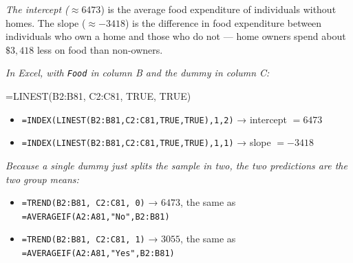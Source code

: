 \documentclass[
  11pt,
  letterpaper,
  DIV=11,
  numbers=noendperiod,
  oneside,
  open=any]{scrreprt}
\newenvironment{Shaded}{\begin{snugshade}}{\end{snugshade}}
\newcommand{\NormalTok}[1]{\textcolor[rgb]{0.00,0.23,0.31}{#1}}
\providecommand{\tightlist}{%
  \setlength{\itemsep}{0pt}\setlength{\parskip}{0pt}}\usepackage{longtable,booktabs,array}
\newenvironment{bsanswerkey}[2]{%
  \begin{tcolorbox}[bsbase, colback=bspaper2, colframe=bsline, fontupper=\small,
    title={\hypertarget{a-#1}{}\label{a-#1}\hyperlink{q-#1}{\textcolor{bsink2}{\MakeUppercase{#2}}}\hfill
      \hyperlink{q-#1}{\textcolor{bsaccent}{\normalfont\footnotesize back to page \pageref{q-#1}}}}]}%
  {\end{tcolorbox}}
\begin{document}
\begin{bsanswerkey}{bsans65}{Exercise 3, question 2}

\emph{The intercept (}\(\approx 6473\)) is the average food expenditure
of individuals without homes. The slope (\(\approx -3418\)) is the
difference in food expenditure between individuals who own a home and
those who do not --- home owners spend about \(\$3,418\) less on food
than non-owners.

\emph{In Excel, with \texttt{Food} in column B and the dummy in column
C:}

\begin{Shaded}
\begin{Highlighting}[]
\NormalTok{=LINEST(B2:B81, C2:C81, TRUE, TRUE)}
\end{Highlighting}
\end{Shaded}

\begin{itemize}
\tightlist
\item
  \texttt{=INDEX(LINEST(B2:B81,C2:C81,TRUE,TRUE),1,2)} → intercept
  \(= 6473\)
\item
  \texttt{=INDEX(LINEST(B2:B81,C2:C81,TRUE,TRUE),1,1)} → slope
  \(= -3418\)
\end{itemize}

\emph{Because a single dummy just splits the sample in two, the two
predictions are the two group means:}

\begin{itemize}
\tightlist
\item
  \texttt{=TREND(B2:B81,\ C2:C81,\ 0)} → \(6473\), the same as
  \texttt{=AVERAGEIF(A2:A81,"No",B2:B81)}
\item
  \texttt{=TREND(B2:B81,\ C2:C81,\ 1)} → \(3055\), the same as
  \texttt{=AVERAGEIF(A2:A81,"Yes",B2:B81)}
\end{itemize}

\end{bsanswerkey}
\end{document}
